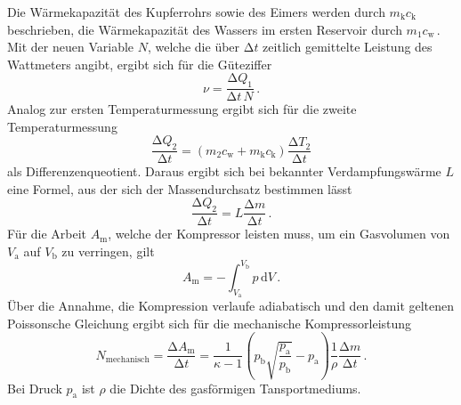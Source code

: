 Die Wärmekapazität des Kupferrohrs sowie des Eimers werden durch $m_\text{k}c_\text{k}$ beschrieben,
die Wärmekapazität des Wassers im ersten Reservoir durch $m_1c_\text{w}$\,.
Mit der neuen Variable $N$, welche die über $\increment t$ zeitlich gemittelte Leistung des 
Wattmeters angibt, ergibt sich für die Güteziffer 
\begin{equation}
    \nu=\frac{\increment Q_1}{\increment t\,N}\,.
    \label{eq:Guetereal}
\end{equation}
Analog zur ersten Temperaturmessung ergibt sich für die zweite Temperaturmessung
\begin{equation}
    \frac{\increment Q_2}{\increment t}=(m_2c_\text{w}+m_\text{k}c_\text{k})\frac{\increment T_2}{\increment t}
\end{equation}
als Differenzenqueotient. Daraus ergibt sich bei bekannter Verdampfungswärme $L$ eine Formel,
aus der sich der Massendurchsatz bestimmen lässt
\begin{equation}
    \frac{\increment Q_2}{\increment t}=L\frac{\increment m}{\increment t}\,.
    \label{eq:massendurchsatz}
\end{equation}
Für die Arbeit $A_\text{m}$, welche der Kompressor leisten muss, um ein Gasvolumen von $V_\text{a}$
auf $V_\text{b}$ zu verringen, gilt 
\begin{equation}
    A_\text{m}=-\int_{V_\text{a}}^{V_\text{b}}p \,\text{d} V\,.
\end{equation}
Über die Annahme, die Kompression verlaufe adiabatisch und den damit geltenen Poissonsche Gleichung
ergibt sich für die mechanische Kompressorleistung
\begin{equation}
N_\text{mechanisch}=\frac{\increment A_\text{m}}{\increment t}=\frac{1}{\kappa-1}\left(p_\text{b}
\sqrt{\frac{p_\text{a}}{p_\text{b}}}-p_\text{a}\right)\frac{1}{\rho}\frac{\increment m}{\increment t}\,.
\label{eq:mechanisch}
\end{equation}
Bei Druck $p_\text{a}$ ist $\rho$ die Dichte des gasförmigen Tansportmediums.

